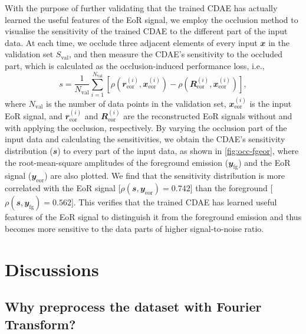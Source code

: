 \documentclass[fleqn,usenatbib]{mnras}
\newcommand{\R}[1]{\mathrm{#1}}
\newcommand{\B}[1]{\mathbfit{#1}}
\begin{document}
{With the purpose of further validating that the trained CDAE has actually
learned the useful features of the EoR signal, we employ the occlusion
method \citep{zeiler2014} to visualise the sensitivity of the trained CDAE
to the different part of the input data.
At each time, we occlude three adjacent elements of every input
$\B{x}$ in the validation set $S_{\R{val}}$, and then measure the CDAE's
sensitivity to the occluded part, which is calculated as the
occlusion-induced performance loss, i.e.,
\begin{equation}
  \label{eq:perf-loss}
  s = \frac{1}{N_{\R{val}}} \sum_{i=1}^{N_{\R{val}}}
    \left[ \rho\left(\B{r}^{(i)}_{\R{eor}}, \B{x}^{(i)}_{\R{eor}}\right) -
      \rho\left(\B{R}^{(i)}_{\R{eor}}, \B{x}^{(i)}_{\R{eor}}\right) \right],
\end{equation}
where
$N_{\R{val}}$ is the number of data points in the validation set,
$\B{x}^{(i)}_{\R{eor}}$ is the input EoR signal, and
$\B{r}^{(i)}_{\R{eor}}$ and $\B{R}^{(i)}_{\R{eor}}$ are the reconstructed
EoR signals without and with applying the occlusion, respectively.
By varying the occlusion part of the input data and calculating the
sensitivities, we obtain the CDAE's sensitivity distribution ($\B{s}$) to
every part of the input data, as shown in \autoref{fig:occ-fgeor}, where
the root-mean-square amplitudes of the foreground emission
($\B{y}_{\R{fg}}$) and the EoR signal ($\B{y}_{\R{eor}}$) are also plotted.
We find that the sensitivity distribution is more correlated with the EoR
signal [$\rho(\B{s}, \B{y}_{\R{eor}}) = 0.742$] than the foreground
[$\rho(\B{s}, \B{y}_{\R{fg}}) = 0.562$].
This verifies that the trained CDAE has learned useful features of the EoR
signal to distinguish it from the foreground emission and thus becomes more
sensitive to the data parts of higher signal-to-noise ratio.
} %


\section{Discussions}
\label{sec:discussions}

\subsection{Why preprocess the dataset with Fourier Transform?}
\label{sec:why-ft}
\end{document}
